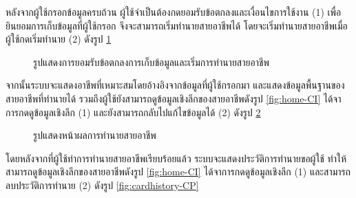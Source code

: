 หลังจากผู้ใช้กรอกข้อมูลครบถ้วน ผู้ใช้จำเป็นต้องกดยอมรับข้อตกลงและเงื่อนไขการใช้งาน (1) เพื่อยินยอมการเก็บข้อมูลที่ผู้ใช้กรอก จึงจะสามารถเริ่มทำนายสายอาชีพได้ โดยจะเริ่มทำนายสายอาชีพเมื่อผู้ใช้กดเริ่มทำนาย (2) ดังรูป \ref{fig:accept-CP}
\begin{figure}[H]\centering
    \caption{รูปแสดงการยอมรับข้อตกลงการเก็บข้อมูลและเริ่มการทำนายสายอาชีพ}\label{fig:accept-CP}
\end{figure}
จากนั้นระบบจะแสดงอาชีพที่เหมาะสมโดยอ้างอิงจากข้อมูลที่ผู้ใช้กรอกมา และแสดงข้อมูลพื้นฐานของสายอาชีพที่ทำนายได้ รวมถึงผู้ใช้ยังสามารถดูข้อมูลเชิงลึกของสายอาชีพดังรูป \ref{fig:home-CI} ได้จาการกดดูข้อมูลเชิงลึก (1) และยังสามารถกลับไปแก้ไขข้อมูลได้ (2) ดังรูป \ref{fig:viewmore-CP} 
\begin{figure}[H]\centering
    \caption{รูปแสดงหน้าผลการทำนายสายอาชีพ}\label{fig:viewmore-CP}
\end{figure}
โดยหลังจากที่ผู้ใช้ทำการทำนายสายอาชีพเรียบร้อยแล้ว ระบบจะแสดงประวัติการทำนายขอผู้ใช้ ทำให้สามารถดูข้อมูลเชิงลึกของสายอาชีพดังรูป \ref{fig:home-CI} ได้จาการกดดูข้อมูลเชิงลึก (1) และสามารถลบประวัติการทำนาย (2) ดังรูป \ref{fig:cardhistory-CP} 
